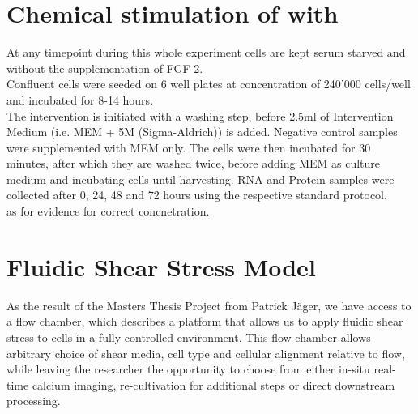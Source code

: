 \section{Chemical stimulation of \Piezo{} with \Yoda{}}
\label{sec:ChemicalStimulation}
At any timepoint during this whole experiment cells are kept serum starved and without the supplementation of FGF-2.\\
Confluent cells were seeded on 6 well plates at concentration of 240'000 cells/well and incubated for 8-14 hours.\\
The intervention is initiated with a washing step, before 2.5ml of Intervention Medium (i.e. MEM\textalpha{} + 5\textmu{}M \Yoda (Sigma-Aldrich)) is added. Negative control samples were supplemented with MEM\textalpha{} only. The cells were then incubated for 30 minutes, after which they are washed twice, before adding MEM\textalpha{} as culture medium and incubating cells until harvesting. RNA and Protein samples were collected after 0, 24, 48 and 72 hours using the respective standard protocol.\\ \cite{Morley2018} as for evidence for correct concnetration.

\section{Fluidic Shear Stress Model}
As the result of the Masters Thesis Project from Patrick Jäger, we have access to a flow chamber, which describes a platform that allows us to apply fluidic shear stress to cells in a fully controlled environment. This flow chamber allows arbitrary choice of shear media, cell type and cellular alignment relative to flow, while leaving the researcher the opportunity to choose from either in-situ real-time calcium imaging, re-cultivation for additional steps or direct downstream processing.

